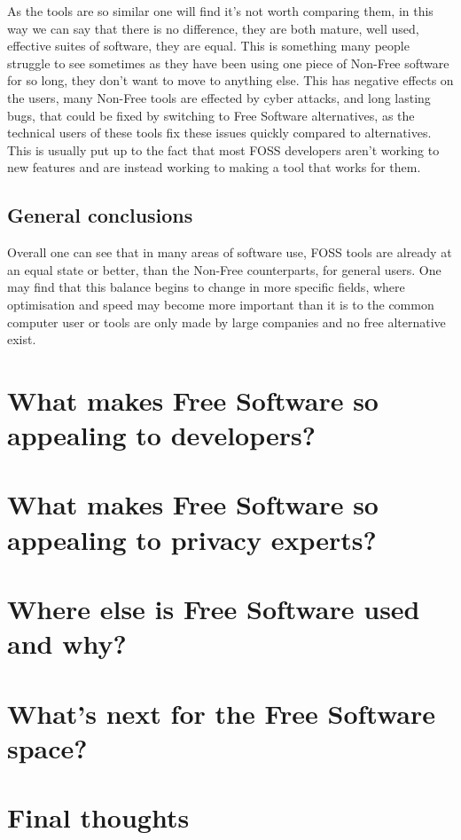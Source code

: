 \documentclass[a4paper,12pt]{article}
\begin{document}
{As the tools are so similar one will find it's not worth comparing them, in this way we can say that there is no
difference, they are both mature, well used, effective suites of software, they are equal. This is something many
people struggle to see sometimes as they have been using one piece of Non-Free software for so long, they don't
want to move to anything else.	This has negative effects on the users, many Non-Free tools are effected by cyber
attacks, and long lasting bugs, that could be fixed by switching to Free Software alternatives, as the technical
users of these tools fix these issues quickly compared to alternatives. This is usually put up to the fact that
most FOSS developers aren't working to new features and are instead working to making a tool that works for them.

\subsection{General conclusions} Overall one can see that in many areas of software use, FOSS tools are already
at an equal state or better, than the Non-Free counterparts, for general users. One may find that this balance
begins to change in more specific fields, where optimisation and speed may become more important than it is to
the common computer user or tools are only made by large companies and no free alternative exist.

\section{What makes Free Software so appealing to developers?} \section{What makes Free Software so appealing to
privacy experts?} \section{Where else is Free Software used and why?} \section{What's next for the Free Software
space?} \section{Final thoughts}

\newpage \printbibliography } 
\end{document}
